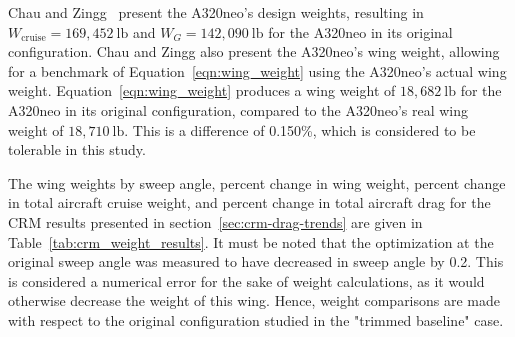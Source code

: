 Chau and Zingg~\cite{chau_aerodynamic_2023} present the A320neo's design weights, resulting in $W_{\text{cruise}}=169,452\ \text{lb}$ and $W_G=142,090\ \text{lb}$ for the A320neo in its original configuration. Chau and Zingg also present the A320neo's wing weight, allowing for a benchmark of Equation~\ref{eqn:wing_weight} using the A320neo's actual wing weight. Equation~\ref{eqn:wing_weight} produces a wing weight of $18,682\ \text{lb}$ for the A320neo in its original configuration, compared to the A320neo's real wing weight of $18,710\ \text{lb}$. This is a difference of 0.150\%, which is considered to be tolerable in this study.

The wing weights by sweep angle, percent change in wing weight, percent change in total aircraft cruise weight, and percent change in total aircraft drag for the CRM results presented in section~\ref{sec:crm-drag-trends} are given in Table~\ref{tab:crm_weight_results}. It must be noted that the optimization at the original sweep angle was measured to have decreased in sweep angle by 0.2\degree. This is considered a numerical error for the sake of weight calculations, as it would otherwise decrease the weight of this wing. Hence, weight comparisons are made with respect to the original configuration studied in the "trimmed baseline" case.

